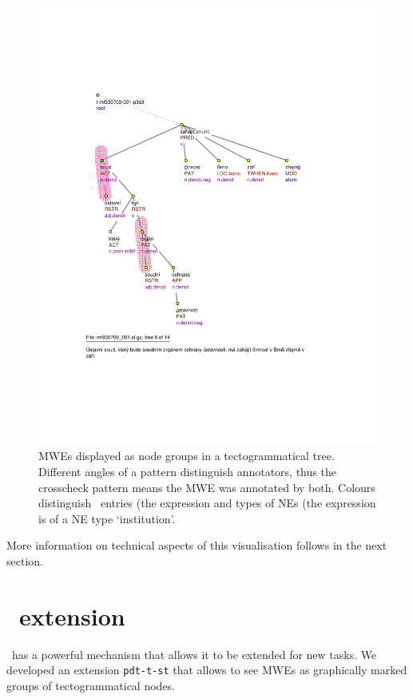 \begin{figure}[htbp]
   \centering
   \includegraphics[width=\textwidth]{images/bubliny.pdf} 
   \caption{MWEs displayed as node groups in a tectogrammatical tree. Different angles of a pattern distinguish annotators, thus the crosscheck pattern means the MWE was annotated by both. Colours distinguish \semlex\ entries (the expression  and types of NEs (the expression  is of a NE type `institution'.}
   \label{fig:nodegroups}
\end{figure}

More information on technical aspects of this visualisation follows in the next section.

\section{\tred\ extension}
\label{sec:s:ext}

\tred\ has a powerful mechanism that allows it to be extended for new tasks. We developed an extension \texttt{pdt-t-st} that allows to see MWEs as graphically marked groups of tectogrammatical nodes. 

